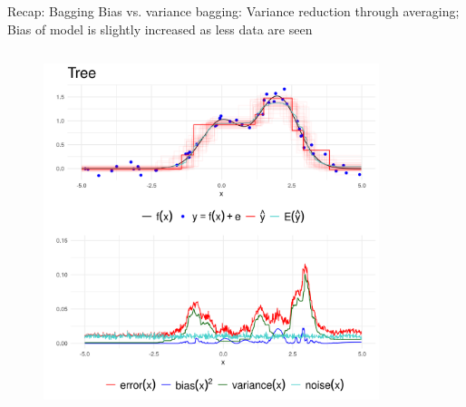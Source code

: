 \documentclass[10pt,compress,t,notes=noshow, xcolor=table]{beamer}
\begin{document}
\begin{vbframe}{Recap: Bagging}
Bias vs. variance bagging: Variance reduction through averaging; Bias of model is slightly increased as less data are seen\\
\begin{columns}
    \begin{column}{0.5\textwidth}
        \vspace{-1em}
        \begin{figure}
            \centering
            \includegraphics{figure_man/bagging_variance_bias_tree.png}
            \label{fig:bagging_tree2}
        \end{figure}
    \end{column}
    \begin{column}{0.5\textwidth}
        \vspace{-1em}
        \begin{figure}
            \centering

\end{figure}
\end{column}
\end{columns}
\end{vbframe}
\end{document}
